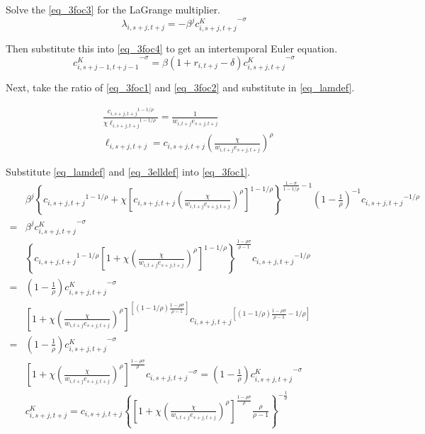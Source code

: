 \documentclass[letterpaper,12pt]{article}
\theoremstyle{definition}
\numberwithin{equation}{section}
\begin{document}
\begin{spacing}{1.5}
	Solve the \eqref{eq_3foc3} for the LaGrange multiplier.
	\begin{equation}\label{eq_lamdef}
	       \lambda_{i,s+j,t+j} = -\beta^j {c^K_{i,s+j,t+j}}^{-\sigma}
	\end{equation}

	Then substitute this into \eqref{eq_3foc4} to get an intertemporal Euler equation.
	\begin{equation}
	       {c^K_{i,s+j-1,t+j-1}}^{-\sigma} = \beta (1+r_{i,t+j}-\delta) {c^K_{i,s+j,t+j}}^{-\sigma}
	\end{equation}

	Next, take the ratio of \eqref{eq_3foc1} and \eqref{eq_3foc2} and substitute in \eqref{eq_lamdef}.

	\begin{align}
		& \frac{{c_{i,s+j,t+j}}^{1-1/\rho}} {\chi {\ell_{i,s+j,t+j}}^{1-1/\rho}} = \frac{1}{w_{i,t+j} e_{s+j,t+j}} \nonumber \\
		& \ell_{i,s+j,t+j} = c_{i,s+j,t+j} \left(\frac{\chi}{w_{i,t+j} e_{s+j,t+j}}\right)^\rho \label{eq_3elldef}
 	\end{align}

	Substitute \eqref{eq_lamdef} and \eqref{eq_3elldef} into \eqref{eq_3foc1}.
	\begin{align}
		& \beta^j \left\{ {c_{i,s+j,t+j}}^{1-1/\rho} + \chi \left[c_{i,s+j,t+j} \left(\frac{\chi}{w_{i,t+j} e_{s+j,t+j}}\right)^\rho\right]^{1-1/\rho}\right\}^{\tfrac{{1-\sigma}}{1-1/\rho}-1} \left(1-\tfrac{1}{\rho}\right)^{-1} {c_{i,s+j,t+j}}^{-1/\rho}  \nonumber \\ = &  \beta^j {c^K_{i,s+j,t+j}}^{-\sigma} \nonumber \\
		& \left\{ {c_{i,s+j,t+j}}^{1-1/\rho} \left[1 + \chi \left(\frac{\chi}{w_{i,t+j} e_{s+j,t+j}}\right)^\rho\right]^{1-1/\rho}\right\}^{\tfrac{1-\rho \sigma}{\rho-1}}  {c_{i,s+j,t+j}}^{-1/\rho}  \nonumber \\ = &  \left(1-\tfrac{1}{\rho}\right) {c^K_{i,s+j,t+j}}^{-\sigma} \nonumber \\
		& \left[1 + \chi \left(\frac{\chi}{w_{i,t+j} e_{s+j,t+j}}\right)^\rho\right]^{\left[(1-1/\rho)
		\tfrac{1-\rho \sigma}{\rho-1}\right]}  {c_{i,s+j,t+j}}^{\left[(1-1/\rho) \tfrac{1-\rho\sigma}{\rho-1}-1/\rho\right]}  \nonumber \\ = &  \left(1-\tfrac{1}{\rho}\right) {c^K_{i,s+j,t+j}}^{-\sigma} \nonumber \\
		& \left[1 + \chi \left(\frac{\chi}{w_{i,t+j} e_{s+j,t+j}}\right)^\rho\right]^{\tfrac{1-\rho \sigma}{\rho}}  {c_{i,s+j,t+j}}^{-\sigma} = \left(1-\tfrac{1}{\rho}\right) {c^K_{i,s+j,t+j}}^{-\sigma} \nonumber \\
		& c^K_{i,s+j,t+j} = c_{i,s+j,t+j} \left\{ \left[1 + \chi \left(\frac{\chi}{w_{i,t+j} e_{s+j,t+j}}\right)^\rho\right]^{\tfrac{1-\rho \sigma}{\rho}} \frac{\rho}{\rho-1} \right\}^{-\tfrac{1}{\sigma}} \nonumber
	\end{align}


\end{spacing}
\end{document}
